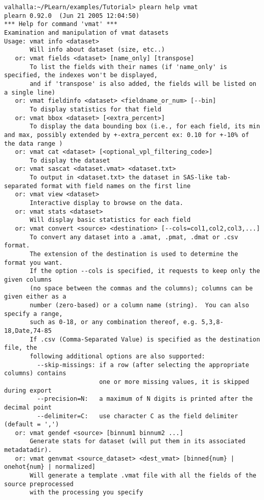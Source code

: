 \documentclass[11pt]{book}
\begin{document}
\begin{verbatim}
valhalla:~/PLearn/examples/Tutorial> plearn help vmat
plearn 0.92.0  (Jun 21 2005 12:04:50)
*** Help for command 'vmat' ***
Examination and manipulation of vmat datasets
Usage: vmat info <dataset>
       Will info about dataset (size, etc..)
   or: vmat fields <dataset> [name_only] [transpose]
       To list the fields with their names (if 'name_only' is specified, the indexes won't be displayed,
       and if 'transpose' is also added, the fields will be listed on a single line)
   or: vmat fieldinfo <dataset> <fieldname_or_num> [--bin]
       To display statistics for that field
   or: vmat bbox <dataset> [<extra_percent>]
       To display the data bounding box (i.e., for each field, its min and max, possibly extended by +-extra_percent ex: 0.10 for +-10% of the data range )
   or: vmat cat <dataset> [<optional_vpl_filtering_code>]
       To display the dataset
   or: vmat sascat <dataset.vmat> <dataset.txt>
       To output in <dataset.txt> the dataset in SAS-like tab-separated format with field names on the first line
   or: vmat view <dataset>
       Interactive display to browse on the data.
   or: vmat stats <dataset>
       Will display basic statistics for each field
   or: vmat convert <source> <destination> [--cols=col1,col2,col3,...]
       To convert any dataset into a .amat, .pmat, .dmat or .csv format.
       The extension of the destination is used to determine the format you want.
       If the option --cols is specified, it requests to keep only the given columns
       (no space between the commas and the columns); columns can be given either as a
       number (zero-based) or a column name (string).  You can also specify a range,
       such as 0-18, or any combination thereof, e.g. 5,3,8-18,Date,74-85
       If .csv (Comma-Separated Value) is specified as the destination file, the
       following additional options are also supported:
         --skip-missings: if a row (after selecting the appropriate columns) contains
                          one or more missing values, it is skipped during export
         --precision=N:   a maximum of N digits is printed after the decimal point
         --delimiter=C:   use character C as the field delimiter (default = ',')
   or: vmat gendef <source> [binnum1 binnum2 ...]
       Generate stats for dataset (will put them in its associated metadatadir).
   or: vmat genvmat <source_dataset> <dest_vmat> [binned{num} | onehot{num} | normalized]
       Will generate a template .vmat file with all the fields of the source preprocessed
       with the processing you specify

\end{verbatim}
\end{document}
